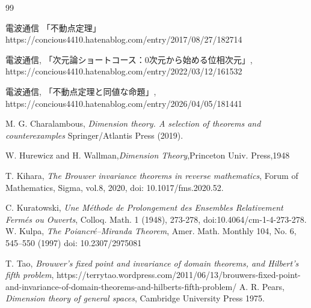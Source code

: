 \documentclass[leqno, a4paper, 12pt]{jsarticle}
\numberwithin{equation}{section}
\begin{document}
\begin{thebibliography}{99}

電波通信
「不動点定理」
https://concious4410.hatenablog.com/entry/2017/08/27/182714




電波通信, 「次元論ショートコース：0次元から始める位相次元」, 
https://concious4410.hatenablog.com/entry/2022/03/12/161532


電波通信, 「不動点定理と同値な命題」, 
https://concious4410.hatenablog.com/entry/2026/04/05/181441

M. G. Charalambous, 
\textit{Dimension theory. A selection of theorems and counterexamples} Springer/Atlantis Press (2019). 

W. Hurewicz and H. Wallman,\textit{Dimension Theory},Princeton Univ. Press,1948


T. Kihara, 
\textit{The Brouwer invariance theorems in reverse mathematics},
Forum of Mathematics, Sigma,
vol.8,  2020, 
 doi: 10.1017/fms.2020.52. 
 
 C. Kuratowski, 
 \textit{Une M\'{e}thode de Prolongement des Ensembles Relativement Ferm\'{e}s ou Ouverts}, Colloq. Math. 1 (1948), 273-278, 
doi:10.4064/cm-1-4-273-278. 
W. Kulpa, 
\textit{The Poiancr\'{e}--Miranda Theorem}, 
Amer. Math. Monthly 104, No. 6, 545--550 (1997)
doi: 10.2307/2975081

T. Tao, 
\textit{Brouwer’s fixed point and invariance of domain theorems, and Hilbert’s fifth problem}, 
https://terrytao.wordpress.com/2011/06/13/brouwers-fixed-point-and-invariance-of-domain-theorems-and-hilberts-fifth-problem/
 A. R. 
 Pears,
 \textit{Dimension theory of general spaces}, 
 {Cambridge} {University} {Press}
1975. 

\end{thebibliography}




			
\end{document}

